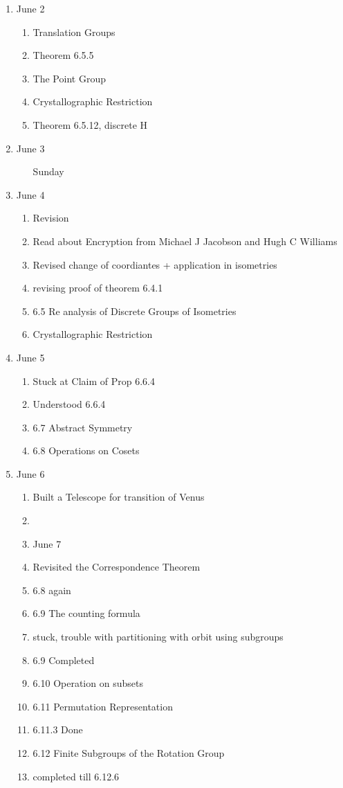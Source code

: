 \begin{enumerate}
		\item June 2
		\begin{enumerate}
		\item Translation Groups
		\item Theorem 6.5.5
		\item The Point Group
		\item Crystallographic Restriction
		\item Theorem 6.5.12, discrete H
		\end{enumerate}
		
		\item June 3
		\begin{enumerate}
		\item [Sunday]
		\end{enumerate}
		
		\item June 4
		\begin{enumerate}
		\item Revision
		\item Read about Encryption from Michael J Jacobson and Hugh C Williams
		\item Revised change of coordiantes + application in isometries
		\item revising proof of theorem 6.4.1
		\item 6.5 Re analysis of Discrete Groups of Isometries
		\item Crystallographic Restriction
		\end{enumerate}
		
		\item June 5
		\begin{enumerate}
		\item Stuck at Claim of Prop 6.6.4
		\item Understood 6.6.4
		\item 6.7 Abstract Symmetry
		\item 6.8 Operations on Cosets
		\end{enumerate}
		
		\item June 6
		\begin{enumerate}
		\item Built a Telescope for transition of Venus
		\item 
		\item June 7
		\item Revisited the Correspondence Theorem
		\item 6.8 again
		\item 6.9 The counting formula
		\item stuck, trouble with partitioning with orbit using subgroups
		\item 6.9 Completed
		\item 6.10 Operation on subsets
		\item 6.11 Permutation Representation
		\item 6.11.3 Done
		\item 6.12 Finite Subgroups of the Rotation Group
		\item completed till 6.12.6
		\end{enumerate}
		

\end{enumerate}
